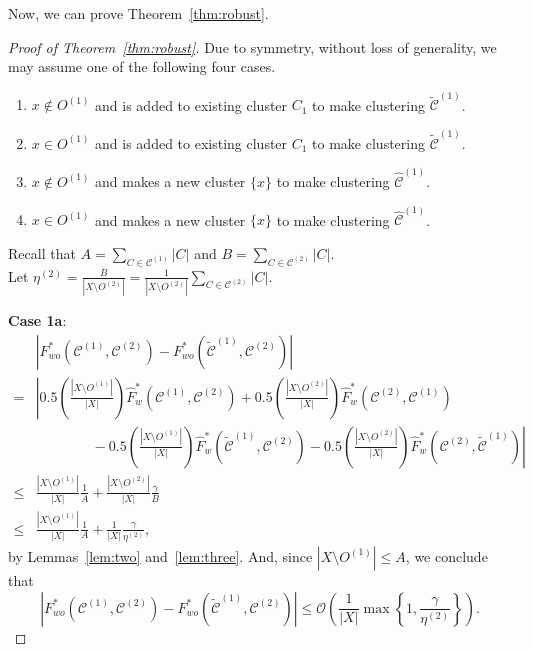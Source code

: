 \documentclass[review,los,12pt]{ryethesis}
\newcommand\cCone{\mathcal{C}^{(1)}}
\newcommand\tcCone{\tilde{\mathcal{C}}^{(1)}}
\newcommand\hcCone{\hat{\mathcal{C}}^{(1)}}
\newcommand\cCtwo{\mathcal{C}^{(2)}}
\newcommand{\bigO}{\mathcal{O}}
\begin{document}
Now, we can prove Theorem~\ref{thm:robust}.
\begin{proof}[Proof of Theorem~\ref{thm:robust}] 
    Due to symmetry, without loss of generality, we may assume one of the following four cases.
    \begin{enumerate}
        \item[1a.] $x \not \in O^{(1)}$ and is added to existing cluster $C_1$ to make clustering $\tcCone$.
        \item[1b.] $x \in O^{(1)}$ and is added to existing cluster $C_1$ to make clustering $\tcCone$.
        \item[2a.] $x \not \in O^{(1)}$ and makes a new cluster $\{x\}$ to make clustering $\hcCone$.
        \item[2b.] $x \in O^{(1)}$ and makes a new cluster $\{x\}$ to make clustering $\hcCone$.
    \end{enumerate}
    Recall that $A = \sum_{C \in \cCone} |C|$ and $B = \sum_{C \in \cCtwo} |C|$.\\
    Let $\eta^{(2)} = \frac{B}{|X \setminus O^{(2)}|} = \frac{1}{|X \setminus O^{(2)}|} \sum_{C \in \cCtwo} |C|$.

    \textbf{Case 1a}:
    \begin{align*}
        & \left| F^*_{wo}(\cCone, \cCtwo) - F^*_{wo}(\tcCone, \cCtwo) \right| \\
        = & \left| 0.5 \left( \frac{|X \setminus O^{(1)}|}{|X|} \right) \hat{F}^*_w(\cCone, \cCtwo) + 0.5 \left( \frac{| X \setminus O^{(2)}|}{|X|} \right) \hat{F}^*_w(\cCtwo, \cCone) \right. \\
        & \left. \qquad \qquad - 0.5 \left( \frac{|X \setminus O^{(1)}|}{|X|} \right) \hat{F}^*_w(\tcCone, \cCtwo) - 0.5 \left( \frac{|X \setminus O^{(2)}|}{|X|} \right) \hat{F}^*_w(\cCtwo, \tcCone) \right| \\
        \leq & \frac{|X \setminus O^{(1)}|}{|X|} \frac{1}{A} + \frac{|X \setminus O^{(2)}|}{|X|} \frac{ \gamma }{B} \\
        \leq & \frac{|X \setminus O^{(1)}|}{|X|} \frac{1}{A} + \frac{1}{|X|} \frac{ \gamma }{\eta^{(2)}},
    \end{align*}
    by Lemmas~\ref{lem:two} and~\ref{lem:three}.
    And, since $|X \setminus O^{(1)}| \leq A$, we conclude that
    \begin{equation*}
        \left| F^*_{wo}(\cCone, \cCtwo) - F^*_{wo}(\tcCone, \cCtwo) \right| \leq \bigO \left( \frac{1}{|X|} \max \left\{ 1, \frac{\gamma }{\eta^{(2)}} \right\} \right).
    \end{equation*}


\end{proof}
\end{document}
